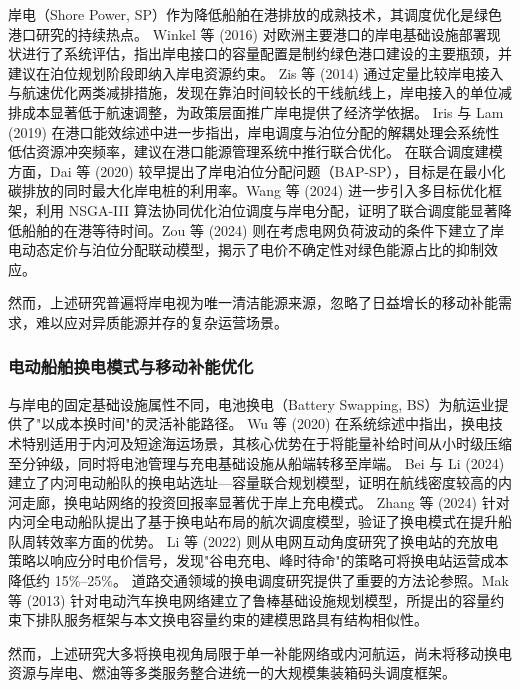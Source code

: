 \documentclass[UTF8, a4paper, 12pt]{ctexart}
\begin{document}
岸电（Shore Power, SP）作为降低船舶在港排放的成熟技术，其调度优化是绿色港口研究的持续热点。
Winkel 等 (2016) \cite{Winkel2016} 对欧洲主要港口的岸电基础设施部署现状进行了系统评估，指出岸电接口的容量配置是制约绿色港口建设的主要瓶颈，并建议在泊位规划阶段即纳入岸电资源约束。
Zis 等 (2014) \cite{Zis2014} 通过定量比较岸电接入与航速优化两类减排措施，发现在靠泊时间较长的干线航线上，岸电接入的单位减排成本显著低于航速调整，为政策层面推广岸电提供了经济学依据。
Iris 与 Lam (2019) \cite{Iris2019} 在港口能效综述中进一步指出，岸电调度与泊位分配的解耦处理会系统性低估资源冲突频率，建议在港口能源管理系统中推行联合优化。
在联合调度建模方面，Dai 等 (2020) \cite{Dai2020} 较早提出了岸电泊位分配问题（BAP-SP），目标是在最小化碳排放的同时最大化岸电桩的利用率。Wang 等 (2024) \cite{Wang2024_SP} 进一步引入多目标优化框架，利用 NSGA-III 算法协同优化泊位调度与岸电分配，证明了联合调度能显著降低船舶的在港等待时间。Zou 等 (2024) \cite{Zou2024} 则在考虑电网负荷波动的条件下建立了岸电动态定价与泊位分配联动模型，揭示了电价不确定性对绿色能源占比的抑制效应。
 
然而，上述研究普遍将岸电视为唯一清洁能源来源，忽略了日益增长的移动补能需求，难以应对异质能源并存的复杂运营场景。
 
\subsubsection{电动船舶换电模式与移动补能优化}
 
与岸电的固定基础设施属性不同，电池换电（Battery Swapping, BS）为航运业提供了"以成本换时间"的灵活补能路径。
Wu 等 (2020) \cite{Zhang2022_EShip} 在系统综述中指出，换电技术特别适用于内河及短途海运场景，其核心优势在于将能量补给时间从小时级压缩至分钟级，同时将电池管理与充电基础设施从船端转移至岸端。
Bei 与 Li (2024) \cite{Bei2024} 建立了内河电动船队的换电站选址—容量联合规划模型，证明在航线密度较高的内河走廊，换电站网络的投资回报率显著优于岸上充电模式。
Zhang 等 (2024) \cite{Zhang2024_Voyage} 针对内河全电动船队提出了基于换电站布局的航次调度模型，验证了换电模式在提升船队周转效率方面的优势。
Li 等 (2022) \cite{Li2022_BSS} 则从电网互动角度研究了换电站的充放电策略以响应分时电价信号，发现"谷电充电、峰时待命"的策略可将换电站运营成本降低约 15\%--25\%。
道路交通领域的换电调度研究提供了重要的方法论参照。Mak 等 (2013) \cite{Mak2013} 针对电动汽车换电网络建立了鲁棒基础设施规划模型，所提出的容量约束下排队服务框架与本文换电容量约束的建模思路具有结构相似性。
 
然而，上述研究大多将换电视角局限于单一补能网络或内河航运，尚未将移动换电资源与岸电、燃油等多类服务整合进统一的大规模集装箱码头调度框架。
 
\end{document}
